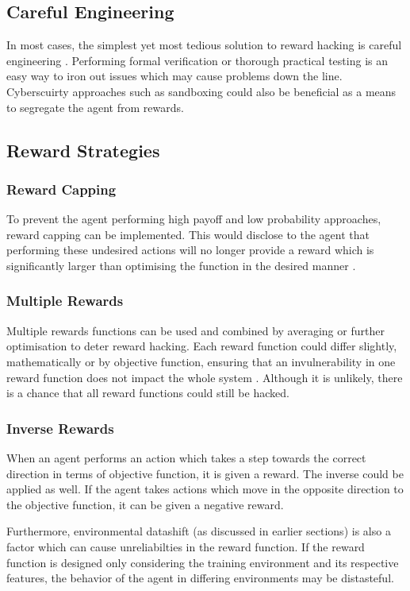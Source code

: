\subsection{Careful Engineering}
In most cases, the simplest yet most tedious solution to reward hacking is careful engineering \cite{Amodei}.
Performing formal verification or thorough practical testing is an easy way to iron out issues which may cause problems down the line.
Cyberscuirty approaches such as sandboxing could also be beneficial as a means to segregate the agent from rewards.

\subsection{Reward Strategies}

\subsubsection{Reward Capping}
To prevent the agent performing high payoff and low probability approaches, reward capping can be implemented.
This would disclose to the agent that performing these undesired actions will no longer provide a reward which is significantly larger than optimising the function in the desired manner \cite{Amodei}.

\subsubsection{Multiple Rewards}
Multiple rewards functions can be used and combined by averaging or further optimisation to deter reward hacking.
Each reward function could differ slightly, mathematically or by objective function, ensuring that an invulnerability in one reward function does not impact the whole system \cite{Amodei}.
Although it is unlikely, there is a chance that all reward functions could still be hacked.

\subsubsection{Inverse Rewards}
When an agent performs an action which takes a step towards the correct direction in terms of objective function, it is given a reward.
The inverse could be applied as well. If the agent takes actions which move in the opposite direction to the objective function, it can be given a negative reward.

Furthermore, environmental datashift (as discussed in earlier sections) is also a factor which can cause unreliabilties in the reward function.
If the reward function is designed only considering the training environment and its respective features, the behavior of the agent in differing environments may be distasteful.

